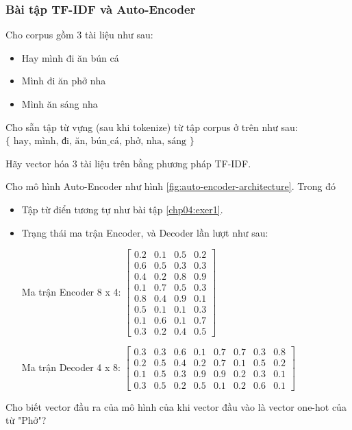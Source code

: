 \subsubsection{Bài tập TF-IDF và Auto-Encoder}
\begin{exer}
\label{chp04:exer1}
Cho corpus gồm 3 tài liệu như sau:

\begin{itemize}
    \item Hay mình đi ăn bún cá
    \item Mình đi ăn phở nha
    \item Mình ăn sáng nha
\end{itemize}

Cho sẵn tập từ vựng (sau khi tokenize) từ tập corpus ở trên như sau: \(\{\text{ hay, mình, đi, ăn, bún\_cá, phở, nha, sáng }\}\)

Hãy vector hóa 3 tài liệu trên bằng phương pháp TF-IDF.
\end{exer}

\begin{exer}
Cho mô hình Auto-Encoder như hình \ref{fig:auto-encoder-architecture}. Trong đó
\begin{itemize}
    \item Tập từ điển tương tự như bài tập \ref{chp04:exer1}.
    \item Trạng thái ma trận Encoder, và Decoder lần lượt như sau:
    
    Ma trận Encoder 8 x 4:
    $\begin{bmatrix}
     0.2 & 0.1 & 0.5 & 0.2 \\
     0.6 & 0.5 & 0.3 & 0.3 \\
     0.4 & 0.2 & 0.8 & 0.9 \\
     0.1 & 0.7 & 0.5 & 0.3 \\
     0.8 & 0.4 & 0.9 & 0.1 \\
     0.5 & 0.1 & 0.1 & 0.3 \\
     0.1 & 0.6 & 0.1 & 0.7 \\
     0.3 & 0.2 & 0.4 & 0.5
    \end{bmatrix}$
    
    Ma trận Decoder 4 x 8:
    $\begin{bmatrix}
     0.3 & 0.3 & 0.6 & 0.1 & 0.7 & 0.7 & 0.3 & 0.8 \\
     0.2 & 0.5 & 0.4 & 0.2 & 0.7 & 0.1 & 0.5 & 0.2 \\
     0.1 & 0.5 & 0.3 & 0.9 & 0.9 & 0.2 & 0.3 & 0.1 \\
     0.3 & 0.5 & 0.2 & 0.5 & 0.1 & 0.2 & 0.6 & 0.1
    \end{bmatrix}$
\end{itemize}
Cho biết vector đầu ra của mô hình của khi vector đầu vào là vector one-hot của từ "Phở"?
\end{exer}